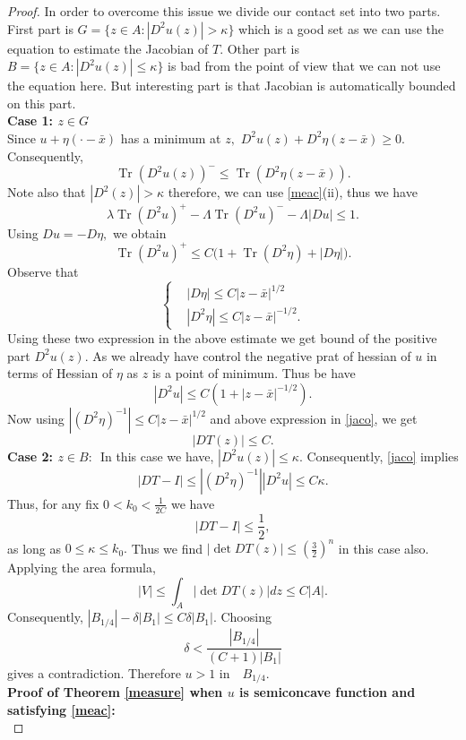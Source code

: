 \documentclass{amsart}
\theoremstyle{plain}
\numberwithin{equation}{section}
\begin{document}
\begin{proof}
In order to overcome this issue we divide our contact set into two parts.\\
First part is $G=\{z\in A:|D^{2}u(z)|>\kappa\}$ which is a good set as we can use the equation to estimate the Jacobian of $T$. Other part is $B=\{z\in A:|D^{2}u(z)|\le\kappa\}$
is bad from the point of view that we can not use the equation here. But interesting part is that Jacobian is automatically bounded on this part.\\
\textbf{Case 1: $z\in G$}\\
Since $u+\eta(\cdot-\bar x)$ has a minimum at $z,$ $D^{2}u(z)+D^{2}\eta(z-\bar x)\ge0.$
Consequently,
\[\operatorname{Tr}(D^{2}u(z))^{-}\leq\operatorname{Tr}(D^{2}\eta(z-\bar x)).\]
Note also that $|D^{2}(z)|>\kappa$ therefore, we can use \eqref{meac}(ii), thus we have
\[\lambda\operatorname{Tr}(D^{2}u)^{+}-\Lambda\operatorname{Tr}(D^{2}u)^{-}-\Lambda|Du|\leq1.\]
Using $Du=-D\eta,$ we obtain
\[\operatorname{Tr}(D^{2}u)^{+}\leq C\Big(1+\operatorname{Tr}(D^{2}\eta)+|D\eta|\Big).\]
Observe that
\begin{equation*}
\left\{
\begin{aligned}
&|D\eta|\leq C|z-\bar x|^{1/2}\\
&|D^{2}\eta|\leq C|z-\bar x|^{-1/2}.
\end{aligned}
\right.
\end{equation*}
Using these two expression in the above estimate we get bound of the positive part $D^{2}u(z).$ As we already have control the negative prat of hessian of $u$ in terms of Hessian of $\eta$ as $z$ is a point of minimum. Thus be have 
\[|D^{2}u|\leq C\left(1+|z-\bar x|^{-1/2}\right).\]
Now using $|(D^{2}\eta)^{-1}|\leq C|z-\bar x|^{1/2}$ and above expression in \eqref{jaco}, we get
\[|DT(z)|\leq C.\]
\textbf{Case 2: $z\in B:$}~In this case we have, $|D^{2}u(z)|\le\kappa.$ Consequently, \eqref{jaco} implies 
\begin{equation}\label{jac111}
|DT-I|\le|(D^{2}\eta)^{-1}||D^{2}u|\leq C\kappa. 
\end{equation}
Thus, for any fix $0<k_{0}<\frac1{2C}$  we have
\[|DT-I|\leq\frac{1}{2},\]
as long as $0\le\kappa\le k_{0}.$ Thus we find $|\det DT(z)|\leq\left(\frac32\right)^n$ in this case also. Applying the area formula,
\[|V|\le\int_{A}|\det DT(z)|dz\leq C|A|.\]
Consequently, $|B_{1/4}|-\delta |B_{1}|\le C\delta |B_{1}|.$ Choosing
\[\delta<\frac{|B_{1/4}|}{(C+1)|B_{1}|}\]
gives a contradiction. Therefore $u>1$ in~~$B_{1/4}.$\\
\textbf{Proof of Theorem \eqref{measure} when $u$ is semiconcave function and satisfying \eqref{meac}:}\\

\end{proof}
\end{document}
